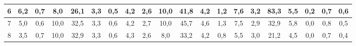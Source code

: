 \begin{sidewaystable}[]
\begin{tabular}{|c|c|c|c|c|c|c|c|c|c|c|c|c|c|c|c|c|c|c|c|}
    6  & 6,2                                              & 0,7                                              & 8,0                                              & 26,1                                             & 3,3                                              & 0,5                                              & 4,2                                              & 2,6                                              & 10,0                                             & 41,8                                             & 4,2                                              & 1,2                                              & 7,6                                              & 3,2                                              & 83,3                                             & 5,5                                              & 0,2                                              & 0,7                                              & 0,6                                              \\ \hline
    7  & 5,0                                              & 0,6                                              & 10,0                                             & 32,5                                             & 3,3                                              & 0,6                                              & 4,2                                              & 2,7                                              & 10,0                                             & 45,7                                             & 4,6                                              & 1,3                                              & 7,5                                              & 2,9                                              & 32,9                                             & 5,8                                              & 0,0                                              & 0,8                                              & 0,5                                              \\ \hline
    8  & 3,5                                              & 0,7                                              & 10,0                                             & 32,9                                             & 3,3                                              & 0,6                                              & 4,3                                              & 2,6                                              & 8,0                                              & 33,2                                             & 4,2                                              & 0,8                                              & 5,5                                              & 3,0                                              & 21,2                                             & 4,5                                              & 0,0                                              & 0,7                                              & 0,4                                              \\ \hline

\end{tabular}
\end{sidewaystable}
